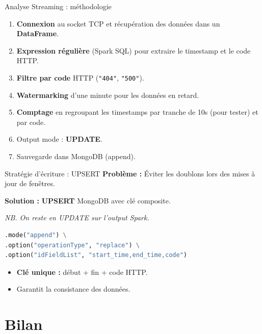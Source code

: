 \documentclass[aspectratio=169]{beamer}
\begin{document}
\begin{frame}[fragile]{Analyse Streaming : méthodologie}

    \begin{enumerate}
        \item \textbf{Connexion} au socket TCP et récupération des données dans un \textbf{DataFrame}.
        \item \textbf{Expression régulière} (Spark SQL) pour extraire le timestamp et le code HTTP.
        \item \textbf{Filtre par code} HTTP (\texttt{"404"}, \texttt{"500"}).
        \item \textbf{Watermarking} d'une minute pour les données en retard.
        \item \textbf{Comptage} en regroupant les timestamps par tranche de 10s (pour tester) et par code.
        \item Output mode : \textbf{UPDATE}.
        \item Sauvegarde dans MongoDB (append).
    \end{enumerate}
 
\end{frame}

\begin{frame}[fragile]{Stratégie d'écriture : UPSERT}
    \textbf{Problème :} Éviter les doublons lors des mises à jour de fenêtres.
    \vspace{0.1cm}
    
    \textbf{Solution :} \textbf{UPSERT} MongoDB avec clé composite. 
    \vspace{0.1cm}
    
    \hspace{1cm}\textit{NB. On reste en UPDATE sur l'output Spark.}
    
\begin{lstlisting}[language=Python]
.mode("append") \
.option("operationType", "replace") \
.option("idFieldList", "start_time,end_time,code")
\end{lstlisting}

    \begin{itemize}
        \item \textbf{Clé unique :} début + fin + code HTTP.
        \item Garantit la consistance des données.
    \end{itemize}
\end{frame}

\section{Bilan}
\end{document}
